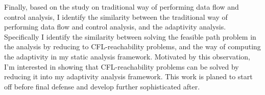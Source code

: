 \begin{abstractpage}
   Finally, based on the study on traditional way of performing data flow and control analysis,
   I identify the similarity between the traditional way of performing data flow and control analysis, and the 
   adaptivity analysis.  
   Specifically I identify the similarity between 
   solving the feasible path problem in the analysis by reducing to CFL-reachability problems,
   and the way of computing the adaptivity in my static analysis framework.
   Motivated by this observation, 
   I'm interested in showing that
   CFL-reachability problems can be solved by reducing it into my adaptivity analysis framework. 
   This work is planed to start off before final defense and develop further sophisticated after.
\end{abstractpage}
